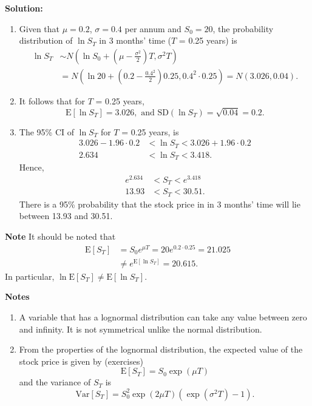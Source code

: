 \documentclass[landscape, 20pt]{extreport}
\theoremstyle{definition}
\theoremstyle{definition}
\theoremstyle{definition}
\theoremstyle{definition}
\theoremstyle{remark}
\begin{document}
\textbf{Solution:}

\begin{enumerate}
\def\labelenumi{\arabic{enumi}.}
\item
  Given that \(\mu = 0.2\), \(\sigma = 0.4\) per annum and \(S_0 = 20\), the
  probability distribution of \(\ln S_T\) in 3 months' time (\(T\) = 0.25
  years) is \[\begin{aligned}
      \ln S_T &\sim  N\left(\ln S_0 +  (\mu - \frac{\sigma^2}{2})T,\sigma^2 T\right) \\
          &= N\left(\ln 20 +  (0.2 - \frac{0.4^2}{2}) 0.25,0.4^2 \cdot 0.25\right) = N(3.026,0.04).\end{aligned}\]
\item
  It follows that for \(T\) = 0.25 years,
  \[\mathrm{E}[\ln S_T] = 3.026,   \text{ and    } \text{SD}(\ln S_T) = \sqrt{0.04} = 0.2.\]
\item
  The 95\% CI of \(\ln S_T\) for \(T\) = 0.25 years, is \[\begin{aligned}
      3.026 - 1.96 \cdot 0.2 &< \ln S_T < 3.026 + 1.96 \cdot 0.2 \\
      2.634 &< \ln S_T < 3.418.\end{aligned}\] Hence,
  \[\begin{aligned}
      e^{2.634} &<  S_T < e^{3.418}\\
          13.93 &<  S_T < 30.51.
      \end{aligned}\] There is a 95\% probability that the stock price
  in in 3 months' time will lie between 13.93 and 30.51.
\end{enumerate}

\textbf{Note} It should be noted that \[\begin{aligned}
    \mathrm{E}[S_T] &= S_0 e^{\mu T} = 20 e^{0.2 \cdot 0.25} = 21.025  \\
     &\neq e^{\mathrm{E}[\ln S_T]}  =  20.615.
    \end{aligned}\] In particular,
\(\ln \mathrm{E}[S_T] \neq \mathrm{E}[\ln S_T]\).

\textbf{Notes}

\begin{enumerate}
\def\labelenumi{\arabic{enumi}.}
\item
  A variable that has a lognormal distribution can take any value
  between zero and infinity. It is not symmetrical unlike the normal
  distribution.
\item
  From the properties of the lognormal distribution, the expected
  value of the stock price is given by (exercises)
  \[\mathrm{E}[S_T] = S_0 \exp (\mu T)\] and the variance of \(S_T\) is
  \[\mathrm{Var}[S_T] = S_0^2 \exp(2 \mu T) (\exp(\sigma^2 T) - 1).\]
\end{enumerate}
\end{document}

